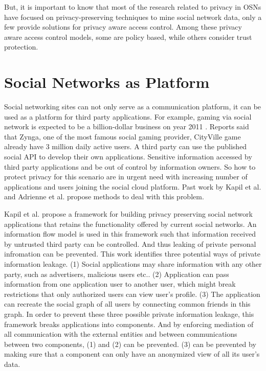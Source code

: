 \documentclass[12pt]{article}
\begin{document}
But, it is important to know that most of the research related to
privacy in OSNs have focused on privacy-preserving techniques to mine
social network data, only a few provide solutions for privacy aware
access control. Among these privacy aware access control models, some
are policy based, while others consider trust protection. 

\section{Social Networks as Platform \label{sec:platform}}
Social networking sites can not only serve as a communication
platform, it can be used as a platform for third party
applications. For example, gaming via social network is expected to be
a billion-dollar business on year 2011 \cite{billion-dollar-social-gaming}. Reports
\cite{zynga} said that Zynga, one of the most famous social gaming
provider, CityVille game already have 3 million daily active users. A
third party can use the published social API to develop their own
applications. Sensitive information accessed by third party
applications and be out of control by information owners. So how to
protect privacy for this scenario are in urgent need with increasing
number of applications and users joining the social cloud
platform. Past work by Kapil et al. \cite{xbook-social-platform} and
Adrienne et al. \cite{privacy-social-platform} propose methods to deal
with this problem. 

Kapil et al. propose a framework for building privacy preserving
social network applications that retains the functionality offered by
current social networks. An information flow model is used in this
framework such that information received by untrusted third party can
be controlled. And thus leaking of private personal infromation can be
prevented. This work identifies three potential ways of private
information leakage. (1) Social applications may share information
with any other party, such as advertisers, malicious users etc.. (2)
Application can pass information from one application user to another
user, which might break restrictions that only authorized users can
view user's profile. (3) The application can recreate the social graph
of all users by connecting common friends in this graph. In order to
prevent these three possible private information leakage, this
framework breaks applications into components. And by enforcing
mediation of all communication with the external entities and between
communications between two components, (1) and (2) can be
prevented. (3) can be prevented by making sure that a component can
only have an anonymized view of all its user's data. 
\end{document}
